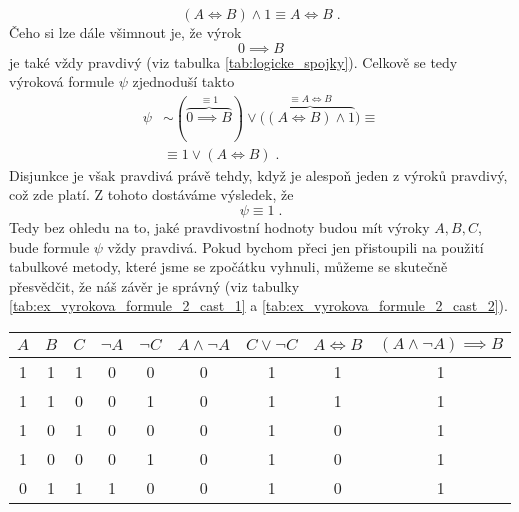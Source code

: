 \begin{example}
\begin{solution}
        \begin{equation*}
            (A \iff B) \land 1 \equiv  A \iff B\; .
        \end{equation*}
        Čeho si lze dále všimnout je, že výrok
        \begin{equation*}
            0 \implies B
        \end{equation*}
        je také vždy pravdivý (viz tabulka \ref{tab:logicke_spojky}). Celkově se tedy výroková formule $\psi$ zjednoduší takto
        \begin{align*}
            \psi&\sim (\overbrace{0 \implies B}^{\equiv 1}) \lor \big(\overbrace{(A \iff B) \land 1}^{\equiv A \iff B}\big)\equiv  \\ &\equiv 1 \lor (A \iff B)\; .
        \end{align*}
        Disjunkce je však pravdivá právě tehdy, když je alespoň jeden z výroků pravdivý, což zde platí. Z tohoto dostáváme výsledek, že
        \begin{equation*}
            \psi\equiv 1\; .
        \end{equation*}
        Tedy bez ohledu na to, jaké pravdivostní hodnoty budou mít výroky $A,B,C$, bude formule $\psi$ vždy pravdivá. Pokud bychom přeci jen přistoupili na použití tabulkové metody, které jsme se zpočátku vyhnuli, můžeme se skutečně přesvědčit, že náš závěr je správný (viz tabulky \ref{tab:ex_vyrokova_formule_2_cast_1} a \ref{tab:ex_vyrokova_formule_2_cast_2}).
        \begin{table}[h]
            \centering
            \begin{tabular}{|ccc|cccccc|}
            \hline
            $A$ & $B$ & $C$ & $\neg A$ & $\neg C$ & $A \land \neg A$ & $C \lor \neg C$ & $A \iff B$ & $(A \land \neg A) \implies B$ \\ \hline
            1   & 1   & 1   & 0        & 0        & 0                & 1                 & 1          & 1                             \\
            1   & 1   & 0   & 0        & 1        & 0                & 1                 & 1          & 1                             \\
            1   & 0   & 1   & 0        & 0        & 0                & 1                 & 0          & 1                             \\
            1   & 0   & 0   & 0        & 1        & 0                & 1                 & 0          & 1                             \\
            0   & 1   & 1   & 1        & 0        & 0                & 1                 & 0          & 1                             \\

\end{tabular}
\end{table}
\end{solution}
\end{example}
